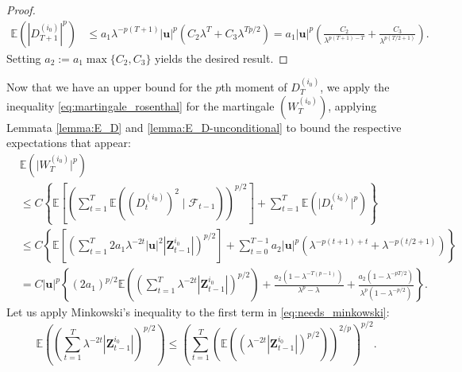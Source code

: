 \documentclass[preprint,3p,12pt]{elsarticle}
\theoremstyle{definition}
\begin{document}
\begin{proof}
\begin{align*}
\mathbb{E}(|D_{T+1}^{(i_0)}|^p)
    &\le a_1 \lambda^{-p(T+1)}|\boldsymbol{u}|^p\left( C_2 \lambda^T   +   C_3 \lambda^{Tp/2}\right) 
    = a_1 |\boldsymbol{u}|^p\left(\frac{ C_2}{\lambda^{p(T+1)-T}} + \frac{C_3}{\lambda^{p(T/2+1)}}\right).
\end{align*}
Setting $a_2 := a_1 \max\{C_2,  C_3 \}$ yields the desired result.
\end{proof}

Now that we have an upper bound for the $p$th moment of $D_T^{(i_0)}$, we apply the inequality \eqref{eq:martingale_rosenthal} for the martingale $(W^{(i_0)}_T)$, applying Lemmata \ref{lemma:E_D} and \ref{lemma:E_D-unconditional} to bound the respective expectations that appear:
\begin{align}
&\mathbb{E}(\lvert W_T^{(i_0)}\rvert^p)  \nonumber\\
&\le C \left\{
\mathbb{E}\left[\left(\sum_{t=1}^T \mathbb{E}\!\left((D_t^{(i_0)})^2 \mid \mathcal{F}_{t-1}\right)\right)^{p/2}\right]
+ \sum_{t=1}^T \mathbb{E}\left(\lvert D_t^{(i_0)}\rvert^p\right)
\right\} \nonumber \\
&\le C \left\{
\mathbb{E}\left[\left(\sum_{t=1}^T 2 a_1 \lambda^{-2t} |\boldsymbol{u}|^2 |\boldsymbol{Z}_{t-1}^{i_0}| \right)^{p/2}\right]+
\sum_{t=0}^{T-1} a_2 |\boldsymbol{u}|^p\left(\lambda^{-p(t+1)+t} + \lambda^{-p(t/2+1)}\right)
\right\} \nonumber \\
&= C |\boldsymbol{u}|^{p}\left\{
(2a_1)^{p/2}\mathbb{E}\left(\left( \sum_{t=1}^T \lambda^{-2t}|\boldsymbol{Z}_{t-1}^{i_0}| \right)^{p/2}\right)  + \frac{a_2  (1-\lambda^{-T(p-1)})}{\lambda^{p}-\lambda} + \frac{a_2 (1-\lambda^{-pT/2})}{\lambda^p(1-\lambda^{-p/2})}
\right\} \label{eq:needs_minkowski}.
\end{align}
Let us apply Minkowski's inequality \cite[e.g.][Theorem 1.31]{kallenberg} to the first term in \eqref{eq:needs_minkowski}:
\begin{equation}
\mathbb{E}\left(\left(\sum_{t=1}^T \lambda^{-2t}|\boldsymbol{Z}_{t-1}^{i_0}| \right)^{p/2}\right) \le   
\left(\sum_{t=1}^T \left(\mathbb{E}\left((\lambda^{-2t}|\boldsymbol{Z}_{t-1}^{i_0}|)^{p/2}\right) \right)^{2/p}\right)^{p/2} \label{eq:last_Z}.
\end{equation}
\end{document}

